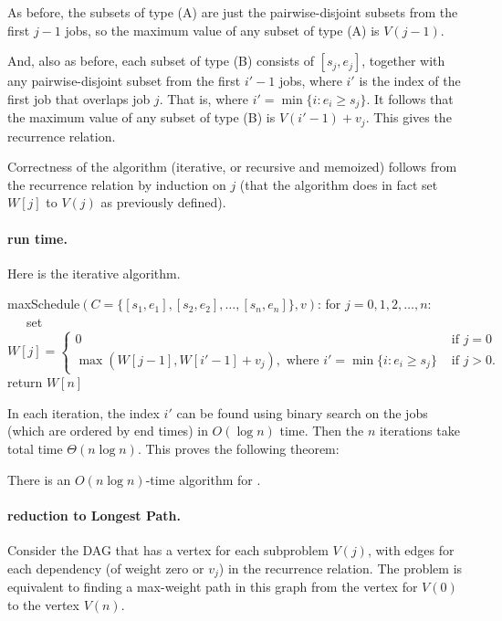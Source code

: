 As before, the subsets of type (A) are just the pairwise-disjoint
subsets from the first $j-1$ jobs,
so the maximum value of any subset of type (A) is $V(j-1)$.

And, also as before,
each subset of type (B) consists of $[s_j, e_j]$,
together with any pairwise-disjoint subset from
the first $i'-1$ jobs, where $i'$
is the index of the first job that overlaps job $j$.
That is, where $i' = \min\{ i: e_i \ge s_j\}$.
It follows that the maximum value of any subset of type (B) is $V(i'-1) + v_j$.
This gives the recurrence relation.

Correctness of the algorithm (iterative, or recursive and memoized)
follows from the recurrence relation by induction on $j$
(that the algorithm does in fact set $W[j]$ to $V(j)$ as previously defined).

\paragraph{run time.}
Here is the iterative algorithm.

\begin{myframed}
  \begin{steps}
  \item[]
    \textsf{maxSchedule}$(C=\{[s_1, e_1], [s_2, e_2], \ldots, [s_n, e_n]\}, v)$:
    \step for $j=0,1,2,\ldots, n$:
    \step~~~set~\(W[j] = \begin{cases}
      0 & \text{ if } j=0 \\
      \max( W[j-1], W[i'-1] + v_j), \text{ where }  i' = \min\{ i : e_i \ge s_j \}
      & \text{ if } j>0.
    \end{cases}\)
    \step return $W[n]$
  \end{steps}
\end{myframed}

In each iteration, the index $i'$ can be found using binary search
on the jobs (which are ordered by end times) in $O(\log n)$ time.
Then the $n$ iterations take total time $\Theta(n\log n)$.
This proves the following theorem:
\begin{theorem}
  There is an $O(n\log n)$-time algorithm for .
\end{theorem}

\paragraph{reduction to Longest Path.}
Consider the DAG that has a vertex for each subproblem $V(j)$,
with edges for each dependency (of weight zero or $v_j$) in the recurrence relation.
The problem is equivalent to finding a max-weight path in this graph from the vertex for $V(0)$
to the vertex $V(n)$.

